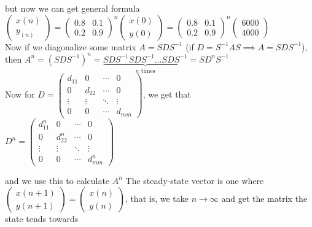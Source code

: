 \documentclass{report}
\begin{document}
{\begin{center}
\begin{center}
    \end{center}
    but now we can get general formula $ \begin{pmatrix} x(n) \\ y_(n) \end{pmatrix} = \begin{pmatrix}  0.8 & 0.1 \\ 0.2 & 0.9 \end{pmatrix}^n \begin{pmatrix} x(0) \\ y(0) \end{pmatrix} =   \begin{pmatrix}  0.8 & 0.1 \\ 0.2 & 0.9 \end{pmatrix}^n \begin{pmatrix} 6000 \\ 4000 \end{pmatrix}  $
    \\ Now if we diagonalize some matrix $A = SDS^{-1}$ (if  $D = S^{-1}AS \implies A = SDS^{-1}$), then $A^n = (SDS^{-1})^n 
    = \underbrace{SDS^{-1}SDS^{-1} \ldots SDS^{-1}}_\text{$n$ times} = SD^nS^{-1}$ \\ Now for $ D = \begin{pmatrix}
    d_{11}  & 0  & \cdots  & 0 \\
    0  & d_{22}  & \cdots  & 0 \\
    \vdots & \vdots & \ddots & \vdots \\
    0  & 0  & \cdots & d_{mm}
    \end{pmatrix} $, we get that \\ $D^n = \begin{pmatrix}
    d_{11}^n  & 0  & \cdots  & 0 \\
    0  & d_{22}^n  & \cdots  & 0 \\
    \vdots & \vdots & \ddots & \vdots \\
    0  & 0  & \cdots & d_{mm}^n
    \end{pmatrix}$  



\end{center}
and we use this to calculate $A^n$
The steady-state vector is one where $\begin{pmatrix} x(n+1) \\ y(n+1) \end{pmatrix} = \begin{pmatrix} x(n) \\ y(n) \end{pmatrix} $, that is, we take $n \to \infty $ and get the matrix the state tends towards
}

\end{document}
